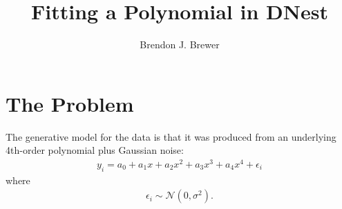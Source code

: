 \documentclass[letterpaper, 11pt]{article}
\title{Fitting a Polynomial in DNest}
\author{Brendon J. Brewer}
\begin{document}
\maketitle


\section{The Problem}
The generative model for the data is that it was produced from an underlying
4th-order polynomial plus Gaussian noise:
\begin{eqnarray}
y_i = a_0 + a_1 x + a_2 x^2 + a_3 x^3 + a_4 x^4 + \epsilon_i
\end{eqnarray}
where
\begin{eqnarray}
\epsilon_i \sim \mathcal{N}(0, \sigma^2).
\end{eqnarray}
\end{document}
